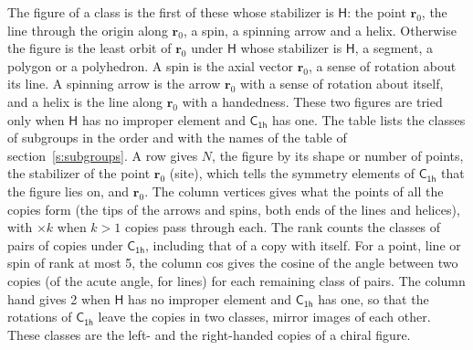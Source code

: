 \documentclass[10pt,a4paper]{article}
\numberwithin{equation}{section}
\newcommand{\grp}[1]{\mathsf{#1}}
\newcommand{\pointr}{\mathbf{r}}
\begin{document}
\leavevmode\label{n:head.figure}The figure of a class is the first of these whose stabilizer is $\grp{H}$: the point $\pointr_0$, the line through the origin along $\pointr_0$, a spin, a spinning arrow and a helix. Otherwise the figure is the least orbit of $\pointr_0$ under $\grp{H}$ whose stabilizer is $\grp{H}$, a segment, a polygon or a polyhedron. A spin is the axial vector $\pointr_0$, a sense of rotation about its line. A spinning arrow is the arrow $\pointr_0$ with a sense of rotation about itself, and a helix is the line along $\pointr_0$ with a handedness. These two figures are tried only when $\grp{H}$ has no improper element and $\grp{C_{1h}}$ has one. The table lists the classes of subgroups in the order and with the names of the table of section~\ref{s:subgroups}. \label{n:head.site}A row gives $N$, the figure by its shape or number of points, the stabilizer of the point $\pointr_0$ (site), which tells the symmetry elements of $\grp{C_{1h}}$ that the figure lies on, and $\pointr_0$. \label{n:head.vertices}The column vertices gives what the points of all the copies form (the tips of the arrows and spins, both ends of the lines and helices), with ${\times}k$ when $k > 1$ copies pass through each. \label{n:head.rank}The rank counts the classes of pairs of copies under $\grp{C_{1h}}$, including that of a copy with itself. \label{n:head.cos}For a point, line or spin of rank at most 5, the column cos gives the cosine of the angle between two copies (of the acute angle, for lines) for each remaining class of pairs. \label{n:head.hand}The column hand gives 2 when $\grp{H}$ has no improper element and $\grp{C_{1h}}$ has one, so that the rotations of $\grp{C_{1h}}$ leave the copies in two classes, mirror images of each other. These classes are the left- and the right-handed copies of a chiral figure.
\end{document}
